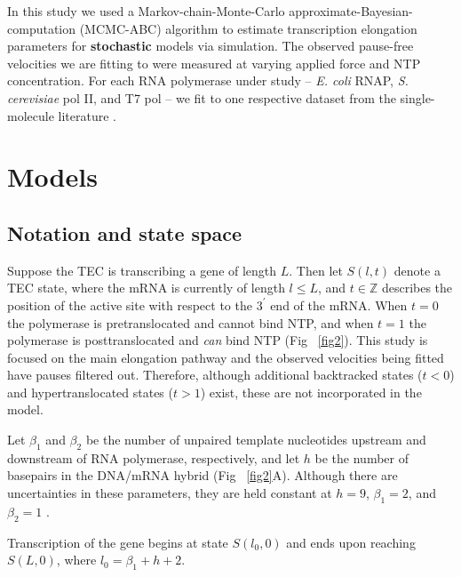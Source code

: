 \documentclass[10pt,letterpaper]{article}
\begin{document}
In this study we used a Markov-chain-Monte-Carlo approximate-Bayesian-computation (MCMC-ABC) algorithm \cite{beaumont2010approximate} to estimate transcription elongation parameters for \textbf{stochastic} models via simulation. The observed pause-free velocities we are fitting to were measured at varying applied force and NTP concentration. For each RNA polymerase under study -- \textit{ E. coli} RNAP, \textit{ S. cerevisiae} pol II, and T7 pol -- we fit to one respective dataset from the single-molecule literature \cite{abbondanzieri2005direct,schweikhard2014transcription,thomen2008t7}.




\section*{Models}



\subsection*{Notation and state space}


Suppose the TEC is transcribing a gene of length $L$. Then let $S(l, t)$ denote a TEC state, where the mRNA is currently of length $l \leq L$, and $t \in \mathbb{Z}$ describes the position of the active site with respect to the $3^\prime$ end of the mRNA. When $t=0$ the polymerase is pretranslocated and cannot bind NTP, and when $t=1$ the polymerase is posttranslocated and \textit{can} bind NTP  (Fig ~\ref{fig2}). This study is focused on the main elongation pathway and the observed velocities being fitted have pauses filtered out. Therefore, although additional backtracked states ($t < 0$) \cite{wang1998force, shaevitz2003backtracking, abbondanzieri2005direct} and hypertranslocated states ($t > 1$) \cite{artsimovitch2000pausing, zhou2007dissociation} exist, these are not incorporated in the model.

Let $\beta_1$ and $\beta_2$ be the number of unpaired template nucleotides upstream and downstream of RNA polymerase, respectively, and let $h$ be the number of basepairs in the DNA/mRNA hybrid (Fig ~\ref{fig2}A). Although there are uncertainties in these parameters, they are held constant at $h = 9$, $\beta_1 = 2$, and $\beta_2 = 1$ \cite{greive2005thinking, maoileidigh2011unified}.

Transcription of the gene begins at state $S(l_0,0)$ and ends upon reaching $S(L, 0)$, where $l_0 = \beta_1 + h + 2$.
\end{document}
